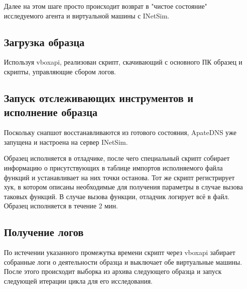 Далее на этом шаге просто происходит возврат в "чистое состояние" исследуемого агента и виртуальной машины с INetSim.

\subsection {Загрузка образца}
Используя vboxapi, реализован скрипт, скачивающий с основного ПК образец и скрипты, управляющие сбором логов.
\subsection {Запуск отслеживающих инструментов и исполнение образца}
Поскольку снапшот восстанавливаются из готового состояния, ApateDNS уже запущена и настроена на сервер INetSim.

Образец исполняется в отладчике, после чего специальный скрипт собирает информацию о присутствующих в таблице импортов исполняемого файла функций и устанавливает на них точки останова. Тот же скрипт регистрирует хук, в котором описаны необходимые для получения параметры в случае вызова таковых функций.
В случае вызова функции, отладчик логирует всё в файл. Образец исполняется в течение 2 мин.
\subsection {Получение логов}
По истечении указанного промежутка времени скрипт через vboxapi забирает собранные логи о деятельности образца и выключает обе виртуальные машины. После этого происходит выборка из архива следующего образца и запуск следующей итерации цикла для его исследования.

 
